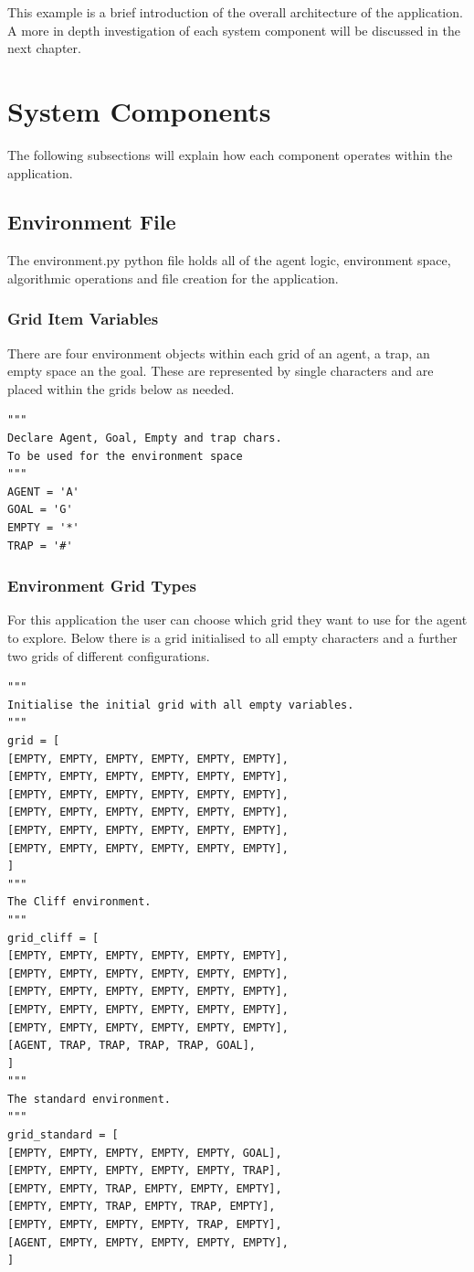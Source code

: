 This example is a brief introduction of the overall architecture of the application. A more in depth investigation of each system component will be discussed in the next chapter.

\section{System Components}
The following subsections will explain how each component operates within the application.

\subsection{Environment File}
The environment.py python file holds all of the agent logic, environment space, algorithmic operations and file creation for the application.

\subsubsection{Grid Item Variables}
There are four environment objects within each grid of an agent, a trap, an empty space an the goal.
These are represented by single characters and are placed within the grids below as needed.
\begin{verbatim}
"""
Declare Agent, Goal, Empty and trap chars.
To be used for the environment space
"""
AGENT = 'A'
GOAL = 'G'
EMPTY = '*'
TRAP = '#'
\end{verbatim}
\subsubsection{Environment Grid Types}
For this application the user can choose which grid they want to use for the agent to explore.
Below there is a grid initialised to all empty characters and a further two grids of different configurations.
\begin{verbatim}
"""
Initialise the initial grid with all empty variables.
"""
grid = [
[EMPTY, EMPTY, EMPTY, EMPTY, EMPTY, EMPTY],
[EMPTY, EMPTY, EMPTY, EMPTY, EMPTY, EMPTY],
[EMPTY, EMPTY, EMPTY, EMPTY, EMPTY, EMPTY],
[EMPTY, EMPTY, EMPTY, EMPTY, EMPTY, EMPTY],
[EMPTY, EMPTY, EMPTY, EMPTY, EMPTY, EMPTY],
[EMPTY, EMPTY, EMPTY, EMPTY, EMPTY, EMPTY],
]
"""
The Cliff environment.
"""
grid_cliff = [
[EMPTY, EMPTY, EMPTY, EMPTY, EMPTY, EMPTY],
[EMPTY, EMPTY, EMPTY, EMPTY, EMPTY, EMPTY],
[EMPTY, EMPTY, EMPTY, EMPTY, EMPTY, EMPTY],
[EMPTY, EMPTY, EMPTY, EMPTY, EMPTY, EMPTY],
[EMPTY, EMPTY, EMPTY, EMPTY, EMPTY, EMPTY],
[AGENT, TRAP, TRAP, TRAP, TRAP, GOAL],
]
"""
The standard environment.
"""
grid_standard = [
[EMPTY, EMPTY, EMPTY, EMPTY, EMPTY, GOAL],
[EMPTY, EMPTY, EMPTY, EMPTY, EMPTY, TRAP],
[EMPTY, EMPTY, TRAP, EMPTY, EMPTY, EMPTY],
[EMPTY, EMPTY, TRAP, EMPTY, TRAP, EMPTY],
[EMPTY, EMPTY, EMPTY, EMPTY, TRAP, EMPTY],
[AGENT, EMPTY, EMPTY, EMPTY, EMPTY, EMPTY],
]
\end{verbatim}

